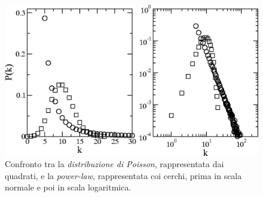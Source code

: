 \documentclass[a4paper,12pt, oneside]{book}
\begin{document}
\begin{figure}
  \centering
  \includegraphics[scale = 0.2]{img/pois.jpeg}
  \caption{Confronto tra la \textit{distribuzione di Poisson}, rappresentata dai
    quadrati, e la \textit{power-law}, rappresentata coi cerchi, prima in scala
    normale e poi in scala logaritmica.}
  \label{fig:pois}
\end{figure}
\end{document}
